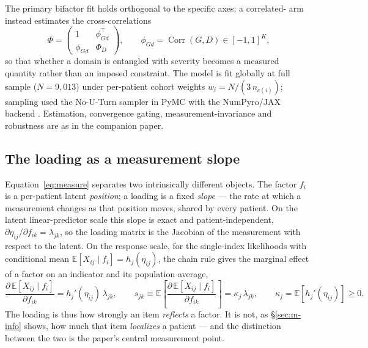 The primary bifactor fit holds \Gfac{} orthogonal to the specific axes; a
correlated-\Gfac{} arm instead estimates the cross-correlations
\begin{equation}
  \Phi=\begin{pmatrix}1 & \phi_{Gd}^{\top}\\[2pt] \phi_{Gd} & \Phi_D\end{pmatrix},
  \qquad \phi_{Gd}=\operatorname{Corr}(G,D)\in[-1,1]^{K},
  \label{eq:corrg}
\end{equation}
so that whether a domain is entangled with severity becomes a measured quantity
rather than an imposed constraint. The model is fit globally at full sample
($N=9{,}013$) under per-patient cohort weights $w_i=N/(3\,n_{c(i)})$; sampling used
the No-U-Turn sampler \citep{hoffman2014nuts} in PyMC \citep{abrilpla2023pymc} with
the NumPyro/JAX backend \citep{phan2019numpyro}. Estimation, convergence gating,
measurement-invariance and robustness are as in the companion paper.

\subsection{The loading as a measurement slope}
\label{sec:m-slope}

Equation~\eqref{eq:measure} separates two intrinsically different objects. The
factor $f_i$ is a per-patient latent \emph{position}; a loading is a fixed
\emph{slope} --- the rate at which a measurement changes as that position moves,
shared by every patient. On the latent linear-predictor scale this slope is exact
and patient-independent, $\partial\eta_{ij}/\partial f_{ik}=\lambda_{jk}$, so the
loading matrix is the Jacobian of the measurement with respect to the latent. On
the response scale, for the single-index likelihoods with conditional mean
$\mathbb E[X_{ij}\mid f_i]=h_j(\eta_{ij})$, the chain rule gives the marginal
effect of a factor on an indicator and its population average,
\begin{equation}
  \frac{\partial\,\mathbb E[X_{ij}\mid f_i]}{\partial f_{ik}}=h_j'(\eta_{ij})\,\lambda_{jk},
  \qquad
  s_{jk}\equiv\mathbb E\!\left[\frac{\partial\,\mathbb E[X_{ij}\mid f_i]}{\partial f_{ik}}\right]
  =\kappa_j\,\lambda_{jk},\qquad
  \kappa_j=\mathbb E\!\left[h_j'(\eta_{ij})\right]\ge 0 .
  \label{eq:m-slope}
\end{equation}
The loading is thus how strongly an item \emph{reflects} a factor. It is not, as
\S\ref{sec:m-info} shows, how much that item \emph{localizes} a patient --- and the
distinction between the two is the paper's central measurement point.

